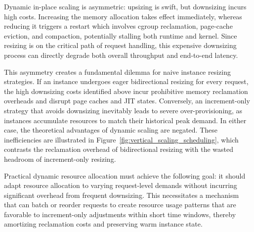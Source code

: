  Dynamic in-place scaling is asymmetric: upsizing is swift, but downsizing incurs high costs. Increasing the memory allocation takes effect immediately, whereas reducing it triggers a restart which involves cgroup reclamation, page-cache eviction, and compaction, potentially stalling both runtime and kernel. Since resizing is on the critical path of request handling, this expensive downsizing process can directly degrade both overall throughput and end-to-end latency.

This asymmetry creates a fundamental dilemma for naive instance resizing strategies. If an instance undergoes eager bidirectional resizing for every request, the high downsizing costs identified above incur prohibitive memory reclamation overheads and disrupt page caches and JIT states. Conversely, an increment-only strategy that avoids downsizing inevitably leads to severe over-provisioning, as instances accumulate resources to match their historical peak demand. In either case, the theoretical advantages of dynamic scaling are negated. These inefficiencies are illustrated in Figure~\ref{fig:vertical_scaling_scheduling}, which contrasts the reclamation overhead of bidirectional resizing with the wasted headroom of increment-only resizing.

Practical dynamic resource allocation must achieve the following goal: it should adapt resource allocation to varying request-level demands without incurring significant overhead from frequent downsizing. This necessitates a mechanism that can batch or reorder requests to create resource usage patterns that are favorable to increment-only adjustments within short time windows, thereby amortizing reclamation costs and preserving warm instance state.
